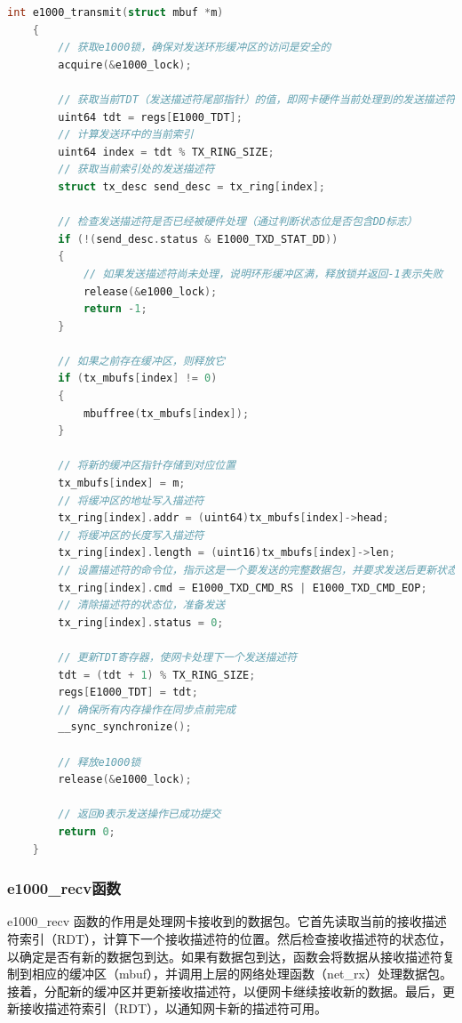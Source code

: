 \begin{lstlisting}[language=c,title=e1000\_transmit函数的实现]
    int e1000_transmit(struct mbuf *m)
    {
        // 获取e1000锁，确保对发送环形缓冲区的访问是安全的
        acquire(&e1000_lock);

        // 获取当前TDT（发送描述符尾部指针）的值，即网卡硬件当前处理到的发送描述符索引
        uint64 tdt = regs[E1000_TDT];
        // 计算发送环中的当前索引
        uint64 index = tdt % TX_RING_SIZE;
        // 获取当前索引处的发送描述符
        struct tx_desc send_desc = tx_ring[index];

        // 检查发送描述符是否已经被硬件处理（通过判断状态位是否包含DD标志）
        if (!(send_desc.status & E1000_TXD_STAT_DD))
        {
            // 如果发送描述符尚未处理，说明环形缓冲区满，释放锁并返回-1表示失败
            release(&e1000_lock);
            return -1;
        }

        // 如果之前存在缓冲区，则释放它
        if (tx_mbufs[index] != 0)
        {
            mbuffree(tx_mbufs[index]);
        }

        // 将新的缓冲区指针存储到对应位置
        tx_mbufs[index] = m;
        // 将缓冲区的地址写入描述符
        tx_ring[index].addr = (uint64)tx_mbufs[index]->head;
        // 将缓冲区的长度写入描述符
        tx_ring[index].length = (uint16)tx_mbufs[index]->len;
        // 设置描述符的命令位，指示这是一个要发送的完整数据包，并要求发送后更新状态
        tx_ring[index].cmd = E1000_TXD_CMD_RS | E1000_TXD_CMD_EOP;
        // 清除描述符的状态位，准备发送
        tx_ring[index].status = 0;

        // 更新TDT寄存器，使网卡处理下一个发送描述符
        tdt = (tdt + 1) % TX_RING_SIZE;
        regs[E1000_TDT] = tdt;
        // 确保所有内存操作在同步点前完成
        __sync_synchronize();

        // 释放e1000锁
        release(&e1000_lock);

        // 返回0表示发送操作已成功提交
        return 0;
    }

\end{lstlisting}

\subsubsection*{e1000\_recv函数}
e1000\_recv 函数的作用是处理网卡接收到的数据包。它首先读取当前的接收描述符索引（RDT），计算下一个接收描述符的位置。然后检查接收描述符的状态位，以确定是否有新的数据包到达。如果有数据包到达，函数会将数据从接收描述符复制到相应的缓冲区（mbuf），并调用上层的网络处理函数（net\_rx）处理数据包。接着，分配新的缓冲区并更新接收描述符，以便网卡继续接收新的数据。最后，更新接收描述符索引（RDT），以通知网卡新的描述符可用。

